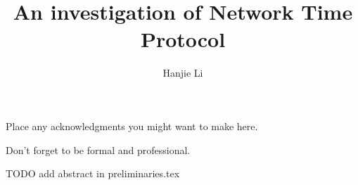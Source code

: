 

\title{An investigation of Network Time Protocol}
\author{Hanjie Li}

\submissionMonth{}	    %






\firstThreePages


\Acknowledgments

Place any acknowledgments you might want to make here.

\noindent
Don't forget to be formal and professional.



\tocAndSuch



TODO add abstract in preliminaries.tex


\afterpreface
